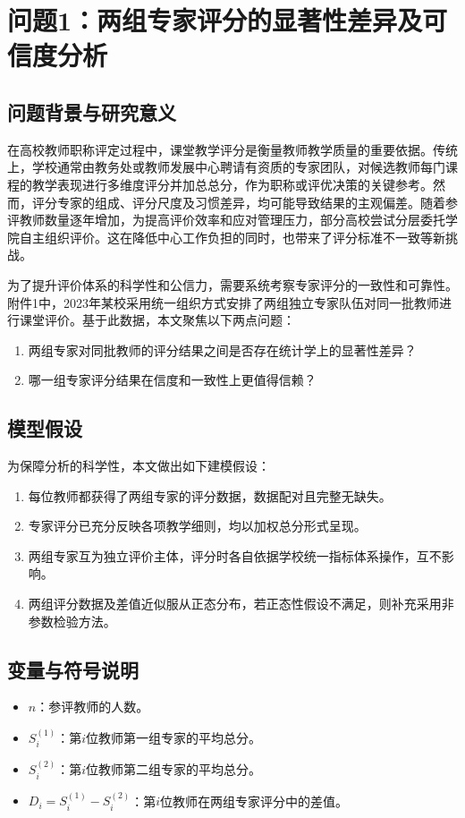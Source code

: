 \section{问题1：两组专家评分的显著性差异及可信度分析}

\subsection{问题背景与研究意义}

\indent 在高校教师职称评定过程中，课堂教学评分是衡量教师教学质量的重要依据。传统上，学校通常由教务处或教师发展中心聘请有资质的专家团队，对候选教师每门课程的教学表现进行多维度评分并加总总分，作为职称或评优决策的关键参考。然而，评分专家的组成、评分尺度及习惯差异，均可能导致结果的主观偏差。随着参评教师数量逐年增加，为提高评价效率和应对管理压力，部分高校尝试分层委托学院自主组织评价。这在降低中心工作负担的同时，也带来了评分标准不一致等新挑战。

为了提升评价体系的科学性和公信力，需要系统考察专家评分的一致性和可靠性。附件1中，2023年某校采用统一组织方式安排了两组独立专家队伍对同一批教师进行课堂评价。基于此数据，本文聚焦以下两点问题：
\begin{enumerate}
    \item 两组专家对同批教师的评分结果之间是否存在统计学上的显著性差异？
    \item 哪一组专家评分结果在信度和一致性上更值得信赖？
\end{enumerate}

\subsection{模型假设}
为保障分析的科学性，本文做出如下建模假设：
\begin{enumerate}
    \item 每位教师都获得了两组专家的评分数据，数据配对且完整无缺失。
    \item 专家评分已充分反映各项教学细则，均以加权总分形式呈现。
    \item 两组专家互为独立评价主体，评分时各自依据学校统一指标体系操作，互不影响。
    \item 两组评分数据及差值近似服从正态分布，若正态性假设不满足，则补充采用非参数检验方法。
\end{enumerate}

\subsection{变量与符号说明}
\begin{itemize}
    \item $n$：参评教师的人数。
    \item $S^{(1)}_i$：第$i$位教师第一组专家的平均总分。
    \item $S^{(2)}_i$：第$i$位教师第二组专家的平均总分。
    \item $D_i = S^{(1)}_i - S^{(2)}_i$：第$i$位教师在两组专家评分中的差值。
\end{itemize}

